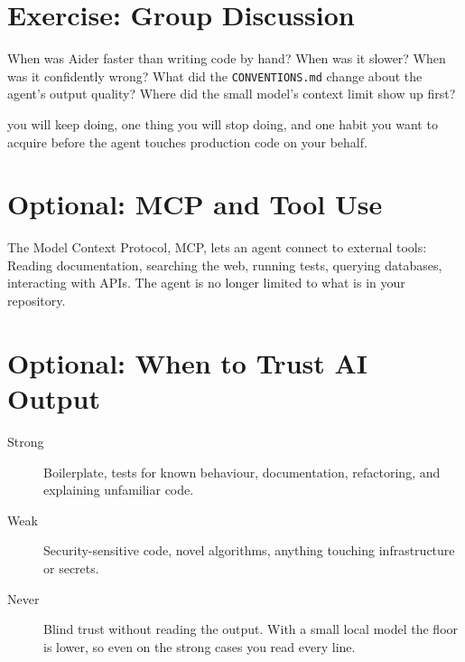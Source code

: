 \section{Exercise: Group Discussion}

 When was Aider faster than writing code by hand? When was
it slower? When was it confidently wrong? What did the \texttt{CONVENTIONS.md} change about the
agent's output quality? Where did the small model's context limit show up first?

 you will keep doing, one thing you will stop doing, and one habit you
want to acquire before the agent touches production code on your behalf.

\newpage
\section{Optional: MCP and Tool Use}

 The Model Context Protocol, MCP, lets an
agent connect to external tools: Reading documentation, searching the web, running tests, querying
databases, interacting with APIs. The agent is no longer limited to what is in your repository.


\newpage
\section{Optional: When to Trust AI Output}

\begin{description}
    \item[Strong] Boilerplate, tests for known behaviour, documentation, refactoring, and
    explaining unfamiliar code.
    \item[Weak] Security-sensitive code, novel algorithms, anything touching infrastructure or
    secrets.
    \item[Never] Blind trust without reading the output. With a small local model the floor is
    lower, so even on the strong cases you read every line.
\end{description}

